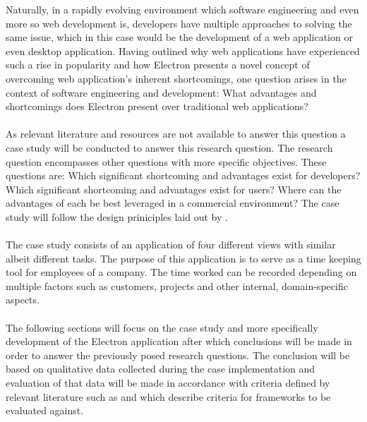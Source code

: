 
Naturally, in a rapidly evolving environment which software engineering and even more so 
web development is, developers have multiple approaches to solving the same issue, which 
in this case would be the development of a web application or even desktop application.
Having outlined why web applications have experienced such a rise in popularity and how
Electron presents a novel concept of overcoming web application's inherent shortcomings, 
one question arises in the context of software engineering and development:
What advantages and shortcomings does Electron present over traditional web applications? \paragraph{}
As relevant literature and resources are not available to answer this question a case study
will be conducted to answer this research question. 
The research question encompasses other questions with more specific objectives. 
These questions are: 
Which significant shortcoming and advantages exist for developers?
Which significant shortcoming and advantages exist for users?
Where can the advantages of each be best leveraged in a commercial environment?
The case study will follow the design priniciples laid out by \textcite{caseStudy}. \paragraph{}
The case study consists of an application of four different views with similar albeit different tasks. 
The purpose of this application is to serve as a time keeping tool for employees of a company.
The time worked can be recorded depending on multiple factors such as customers, projects and other
internal, domain-specific aspects.\paragraph{}
The following sections will focus on the case study and more specifically 
development of the Electron application after which conclusions
will be made in order to answer the previously posed research questions.
The conclusion will be based on qualitative data collected during
the case implementation and evaluation of that data will be made in 
accordance with criteria defined by relevant literature such as \textcite{frameworksEfficiency} 
and \textcite{backEndComparison} which describe criteria for frameworks to be
evaluated against.\paragraph{}